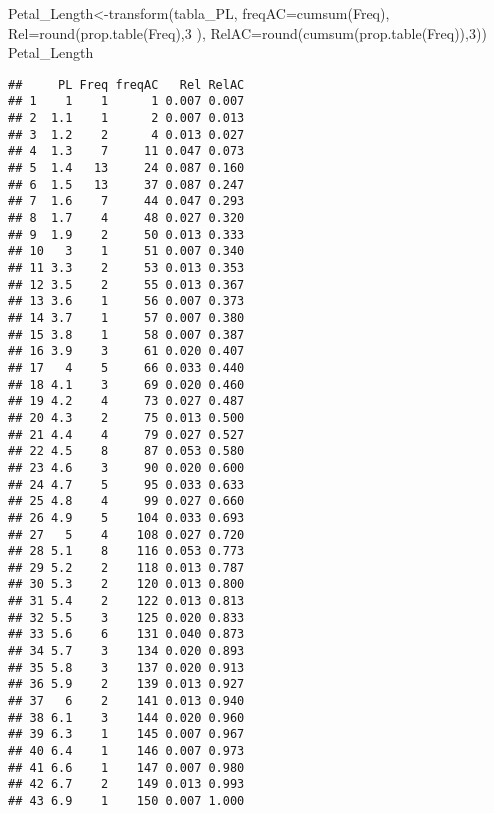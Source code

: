 \documentclass[
]{article}
\newenvironment{Shaded}{\begin{snugshade}}{\end{snugshade}}
\newcommand{\AttributeTok}[1]{\textcolor[rgb]{0.77,0.63,0.00}{#1}}
\newcommand{\DecValTok}[1]{\textcolor[rgb]{0.00,0.00,0.81}{#1}}
\newcommand{\FunctionTok}[1]{\textcolor[rgb]{0.00,0.00,0.00}{#1}}
\newcommand{\NormalTok}[1]{#1}
\newcommand{\OtherTok}[1]{\textcolor[rgb]{0.56,0.35,0.01}{#1}}
\newcommand{\SpecialCharTok}[1]{\textcolor[rgb]{0.00,0.00,0.00}{#1}}
\begin{document}
\begin{Shaded}
\end{Shaded}

\begin{Shaded}
\begin{Highlighting}[]
\NormalTok{Petal\_Length}\OtherTok{\textless{}{-}}\FunctionTok{transform}\NormalTok{(tabla\_PL,}
          \AttributeTok{freqAC=}\FunctionTok{cumsum}\NormalTok{(Freq),}
          \AttributeTok{Rel=}\FunctionTok{round}\NormalTok{(}\FunctionTok{prop.table}\NormalTok{(Freq),}\DecValTok{3}\NormalTok{ ),}
          \AttributeTok{RelAC=}\FunctionTok{round}\NormalTok{(}\FunctionTok{cumsum}\NormalTok{(}\FunctionTok{prop.table}\NormalTok{(Freq)),}\DecValTok{3}\NormalTok{))}
\NormalTok{Petal\_Length}
\end{Highlighting}
\end{Shaded}

\begin{verbatim}
##     PL Freq freqAC   Rel RelAC
## 1    1    1      1 0.007 0.007
## 2  1.1    1      2 0.007 0.013
## 3  1.2    2      4 0.013 0.027
## 4  1.3    7     11 0.047 0.073
## 5  1.4   13     24 0.087 0.160
## 6  1.5   13     37 0.087 0.247
## 7  1.6    7     44 0.047 0.293
## 8  1.7    4     48 0.027 0.320
## 9  1.9    2     50 0.013 0.333
## 10   3    1     51 0.007 0.340
## 11 3.3    2     53 0.013 0.353
## 12 3.5    2     55 0.013 0.367
## 13 3.6    1     56 0.007 0.373
## 14 3.7    1     57 0.007 0.380
## 15 3.8    1     58 0.007 0.387
## 16 3.9    3     61 0.020 0.407
## 17   4    5     66 0.033 0.440
## 18 4.1    3     69 0.020 0.460
## 19 4.2    4     73 0.027 0.487
## 20 4.3    2     75 0.013 0.500
## 21 4.4    4     79 0.027 0.527
## 22 4.5    8     87 0.053 0.580
## 23 4.6    3     90 0.020 0.600
## 24 4.7    5     95 0.033 0.633
## 25 4.8    4     99 0.027 0.660
## 26 4.9    5    104 0.033 0.693
## 27   5    4    108 0.027 0.720
## 28 5.1    8    116 0.053 0.773
## 29 5.2    2    118 0.013 0.787
## 30 5.3    2    120 0.013 0.800
## 31 5.4    2    122 0.013 0.813
## 32 5.5    3    125 0.020 0.833
## 33 5.6    6    131 0.040 0.873
## 34 5.7    3    134 0.020 0.893
## 35 5.8    3    137 0.020 0.913
## 36 5.9    2    139 0.013 0.927
## 37   6    2    141 0.013 0.940
## 38 6.1    3    144 0.020 0.960
## 39 6.3    1    145 0.007 0.967
## 40 6.4    1    146 0.007 0.973
## 41 6.6    1    147 0.007 0.980
## 42 6.7    2    149 0.013 0.993
## 43 6.9    1    150 0.007 1.000
\end{verbatim}
\end{document}
